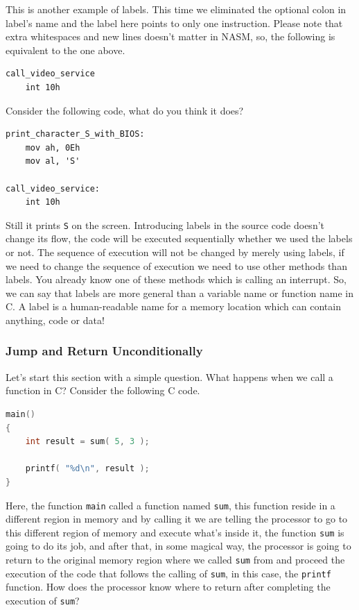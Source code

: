 This is another example of labels. This time we eliminated the optional
colon in label's name and the label here points to only one instruction.
Please note that extra whitespaces and new lines doesn't matter in NASM,
so, the following is equivalent to the one above.

\begin{lstlisting}
call_video_service
    int 10h
\end{lstlisting}

Consider the following code, what do you think it does?

\begin{lstlisting}
print_character_S_with_BIOS:
    mov ah, 0Eh
    mov al, 'S'

call_video_service:
    int 10h
\end{lstlisting}

Still it prints \lstinline!S! on the screen. Introducing labels in the
source code doesn't change its flow, the code will be executed
sequentially whether we used the labels or not. The sequence of
execution will not be changed by merely using labels, if we need to
change the sequence of execution we need to use other methods than
labels. You already know one of these methods which is calling an
interrupt. So, we can say that labels are more general than a variable
name or function name in C. A label is a human-readable name for a
memory location which can contain anything, code or data!

\subsubsection{Jump and Return
Unconditionally}\label{jump-and-return-unconditionally}

Let's start this section with a simple question. What happens when we
call a function in C? Consider the following C code.

\begin{lstlisting}[language=C]
main()
{
    int result = sum( 5, 3 );

    printf( "%d\n", result );
}
\end{lstlisting}

Here, the function \lstinline!main! called a function named
\lstinline!sum!, this function reside in a different region in memory
and by calling it we are telling the processor to go to this different
region of memory and execute what's inside it, the function
\lstinline!sum! is going to do its job, and after that, in some magical
way, the processor is going to return to the original memory region
where we called \lstinline!sum! from and proceed the execution of the
code that follows the calling of \lstinline!sum!, in this case, the
\lstinline!printf! function. How does the processor know where to return
after completing the execution of \lstinline!sum!?

